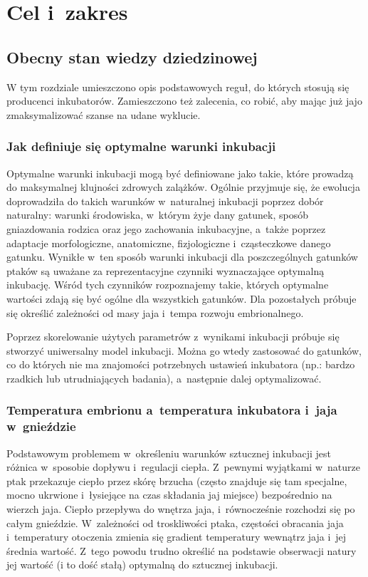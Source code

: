 
\chapter{Cel i~zakres}
\label{sec:CeliZakres}
\section{Obecny stan wiedzy dziedzinowej}
W tym rozdziale umieszczono opis podstawowych reguł, do których stosują się
producenci inkubatorów. Zamieszczono też zalecenia, co robić, aby mając już jajo
zmaksymalizować szanse na udane wyklucie. 

\subsection{Jak definiuje się optymalne warunki inkubacji}
Optymalne warunki inkubacji mogą być definiowane jako takie, które prowadzą do
maksymalnej klujności zdrowych zalążków. Ogólnie przyjmuje się, że ewolucja
doprowadziła do takich warunków w~naturalnej inkubacji poprzez dobór naturalny:
warunki środowiska, w~którym żyje dany gatunek, sposób gniazdowania rodzica oraz
jego zachowania inkubacyjne, a~także poprzez adaptacje morfologiczne,
anatomiczne, fizjologiczne i~cząsteczkowe danego gatunku. Wynikłe w~ten sposób
warunki inkubacji dla poszczególnych gatunków ptaków są uważane za
reprezentacyjne czynniki wyznaczające optymalną inkubację. Wśród tych czynników
rozpoznajemy takie, których optymalne wartości zdają się być ogólne dla
wszystkich gatunków. Dla pozostałych próbuje się określić zależności od masy
jaja i~tempa rozwoju embrionalnego.

Poprzez skorelowanie użytych parametrów z~wynikami inkubacji próbuje się
stworzyć uniwersalny model inkubacji. Można go wtedy zastosować do gatunków, co
do których nie ma znajomości potrzebnych ustawień inkubatora (np.: bardzo
rzadkich lub utrudniających badania), a~następnie dalej optymalizować.

\subsection{Temperatura embrionu a~temperatura inkubatora i~jaja w~gnieździe}
Podstawowym problemem w~określeniu warunków sztucznej inkubacji jest różnica
w~sposobie dopływu i~regulacji ciepła. Z~pewnymi wyjątkami w~naturze ptak
przekazuje ciepło przez skórę brzucha (często znajduje się tam specjalne, mocno
ukrwione i~łysiejące na czas składania jaj miejsce) bezpośrednio na wierzch
jaja. Ciepło przepływa do wnętrza jaja, i~równocześnie rozchodzi się po całym
gnieździe. W~zależności od troskliwości ptaka, częstości obracania jaja
i~temperatury otoczenia zmienia się gradient temperatury wewnątrz jaja i~jej
średnia wartość. Z~tego powodu trudno określić na podstawie obserwacji natury
jej wartość (i to dość stałą) optymalną do sztucznej inkubacji.

